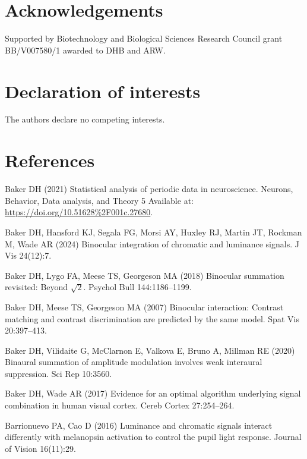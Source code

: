 \documentclass[
]{article}
\begin{document}
\hypertarget{acknowledgements}{%
\section{Acknowledgements}\label{acknowledgements}}

Supported by Biotechnology and Biological Sciences Research Council grant BB/V007580/1 awarded to DHB and ARW.

\hypertarget{declaration-of-interests}{%
\section{Declaration of interests}\label{declaration-of-interests}}

The authors declare no competing interests.

\hypertarget{references}{%
\section{References}\label{references}}

\hypertarget{refs}{}
\leavevmode\hypertarget{ref-Baker2021}{}%
Baker DH (2021) Statistical analysis of periodic data in neuroscience. Neurons, Behavior, Data analysis, and Theory 5 Available at: \url{https://doi.org/10.51628\%2F001c.27680}.

\leavevmode\hypertarget{ref-Baker2024}{}%
Baker DH, Hansford KJ, Segala FG, Morsi AY, Huxley RJ, Martin JT, Rockman M, Wade AR (2024) Binocular integration of chromatic and luminance signals. J Vis 24(12):7.

\leavevmode\hypertarget{ref-Baker2018}{}%
Baker DH, Lygo FA, Meese TS, Georgeson MA (2018) Binocular summation revisited: Beyond \(\sqrt{2}\). Psychol Bull 144:1186--1199.

\leavevmode\hypertarget{ref-Baker2007}{}%
Baker DH, Meese TS, Georgeson MA (2007) Binocular interaction: Contrast matching and contrast discrimination are predicted by the same model. Spat Vis 20:397--413.

\leavevmode\hypertarget{ref-Baker2020}{}%
Baker DH, Vilidaite G, McClarnon E, Valkova E, Bruno A, Millman RE (2020) Binaural summation of amplitude modulation involves weak interaural suppression. Sci Rep 10:3560.

\leavevmode\hypertarget{ref-Baker2017}{}%
Baker DH, Wade AR (2017) Evidence for an optimal algorithm underlying signal combination in human visual cortex. Cereb Cortex 27:254--264.

\leavevmode\hypertarget{ref-Barrionuevo2016}{}%
Barrionuevo PA, Cao D (2016) Luminance and chromatic signals interact differently with melanopsin activation to control the pupil light response. Journal of Vision 16(11):29.
\end{document}
